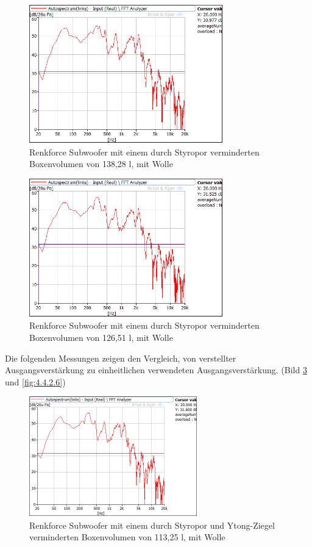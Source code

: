\begin{figure} [H]
\centering
\includegraphics[width=0.75\textwidth]{img/Optimierung/Sub/RenkforceStyro_138l_Wolle.png}
\caption{Renkforce Subwoofer mit einem durch Styropor verminderten Boxenvolumen von 138,28 l, mit Wolle}
\label{fig:4.4.2.3}
\end{figure}

\begin{figure} [H]
\centering
\includegraphics[width=0.75\textwidth]{img/Optimierung/Sub/RenkforceStyro_126l_Wolle.png}
\caption{Renkforce Subwoofer mit einem durch Styropor verminderten Boxenvolumen von 126,51 l, mit Wolle}
\label{fig:4.4.2.4}
\end{figure}

\newpage
Die folgenden Messungen zeigen den Vergleich, von verstellter Ausgangsverstärkung zu einheitlichen verwendeten Ausgangsverstärkung. (Bild \ref{fig:4.4.2.5} und \ref{fig:4.4.2.6})
\begin{figure} [H]
\centering
\includegraphics[width=0.65\textwidth]{img/Optimierung/Sub/RenkforceStyro_113l_Wolle.png}
\caption{Renkforce Subwoofer mit einem durch Styropor und Ytong-Ziegel verminderten Boxenvolumen von 113,25 l, mit Wolle}
\label{fig:4.4.2.5}
\end{figure}

